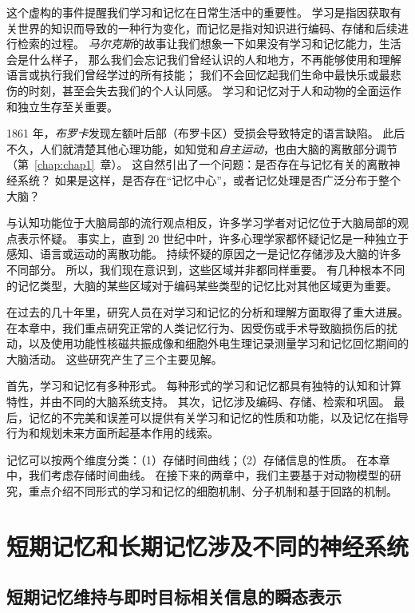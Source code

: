 这个虚构的事件提醒我们学习和记忆在日常生活中的重要性。
学习是指因获取有关世界的知识而导致的一种行为变化，而记忆是指对知识进行编码、存储和后续进行检索的过程。
\textit{马尔克斯}的故事让我们想象一下如果没有学习和记忆能力，生活会是什么样子，
那么我们会忘记我们曾经认识的人和地方，不再能够使用和理解语言或执行我们曾经学过的所有技能；
我们不会回忆起我们生命中最快乐或最悲伤的时刻，甚至会失去我们的个人认同感。
学习和记忆对于人和动物的全面运作和独立生存至关重要。


1861 年，\textit{布罗卡}发现左额叶后部（布罗卡区）受损会导致特定的语言缺陷。
此后不久，人们就清楚其他心理功能，如知觉和\textit{自主运动}，也由大脑的离散部分调节（第~\ref{chap:chap1}~章）。
这自然引出了一个问题：是否存在与记忆有关的离散神经系统？
如果是这样，是否存在“记忆中心”，或者记忆处理是否广泛分布于整个大脑？


与认知功能位于大脑局部的流行观点相反，许多学习学者对记忆位于大脑局部的观点表示怀疑。
事实上，直到 20 世纪中叶，许多心理学家都怀疑记忆是一种独立于感知、语言或运动的离散功能。
持续怀疑的原因之一是记忆存储涉及大脑的许多不同部分。
所以，我们现在意识到，这些区域并非都同样重要。
有几种根本不同的记忆类型，大脑的某些区域对于编码某些类型的记忆比对其他区域更为重要。


在过去的几十年里，研究人员在对学习和记忆的分析和理解方面取得了重大进展。
在本章中，我们重点研究正常的人类记忆行为、因受伤或手术导致脑损伤后的扰动，以及使用功能性核磁共振成像和细胞外电生理记录测量学习和记忆回忆期间的大脑活动。
这些研究产生了三个主要见解。


首先，学习和记忆有多种形式。
每种形式的学习和记忆都具有独特的认知和计算特性，并由不同的大脑系统支持。
其次，记忆涉及编码、存储、检索和巩固。
最后，记忆的不完美和误差可以提供有关学习和记忆的性质和功能，以及记忆在指导行为和规划未来方面所起基本作用的线索。


记忆可以按两个维度分类：（1）存储时间曲线；（2）存储信息的性质。
在本章中，我们考虑存储时间曲线。
在接下来的两章中，我们主要基于对动物模型的研究，重点介绍不同形式的学习和记忆的细胞机制、分子机制和基于回路的机制。



\section{短期记忆和长期记忆涉及不同的神经系统}

\subsection{短期记忆维持与即时目标相关信息的瞬态表示}

